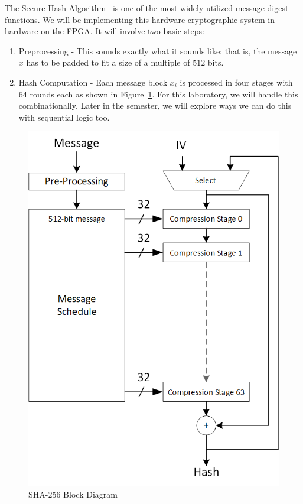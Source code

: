 \documentclass{article}
\begin{document}
The Secure Hash Algorithm~\cite{1250396} is one of the most widely
utilized message digest functions.  We will be implementing this
hardware cryptographic system in hardware on the FPGA.  It will
involve two basic steps:
\begin{enumerate}
  \item Preprocessing - This sounds exactly what it sounds like; that
    is, the message $x$ has to be padded to fit a size of a multiple
    of $512$ bits.
    \item Hash Computation - Each message block $x_i$ is processed in
      four stages with $64$ rounds each as shown in
      Figure~\ref{sha2.fig}.  For this laboratory, we will handle this
      combinationally.  Later in the semester, we will explore ways we
      can do this with sequential logic too.
\end{enumerate}
\begin{figure} [t!]
  \centering
  \includegraphics[scale=0.7]{sha256.png}
  \caption{SHA-256 Block Diagram}
  \label{sha2.fig}
\end{figure}
\end{document}
